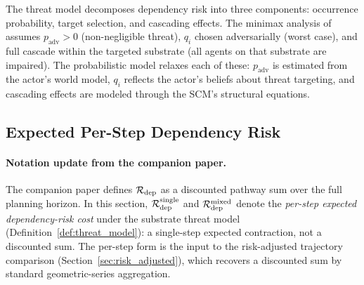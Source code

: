 The threat model decomposes dependency risk into three components:
occurrence probability, target selection, and cascading effects. The
minimax analysis of \citet{lasser2026horizon} assumes $p_{\mathrm{adv}} > 0$
(non-negligible threat), $q_i$ chosen adversarially (worst case), and full
cascade within the targeted substrate (all agents on that substrate are
impaired). The probabilistic model relaxes each of these: $p_{\mathrm{adv}}$
is estimated from the actor's world model, $q_i$ reflects the actor's
beliefs about threat targeting, and cascading effects are modeled through
the SCM's structural equations.

\subsection{Expected Per-Step Dependency Risk}

\paragraph{Notation update from the companion paper.} The companion
paper \citep{lasser2026horizon} defines $\mathcal{R}_{\mathrm{dep}}$ as a
discounted pathway sum over the full planning horizon. In this
section, $\mathcal{R}_{\mathrm{dep}}^{\mathrm{single}}$ and
$\mathcal{R}_{\mathrm{dep}}^{\mathrm{mixed}}$ denote the \emph{per-step
expected dependency-risk cost} under the substrate threat model
(Definition~\ref{def:threat_model}): a single-step expected
contraction, not a discounted sum. The per-step form is the input to
the risk-adjusted trajectory comparison
(Section~\ref{sec:risk_adjusted}), which recovers a discounted sum
by standard geometric-series aggregation.

